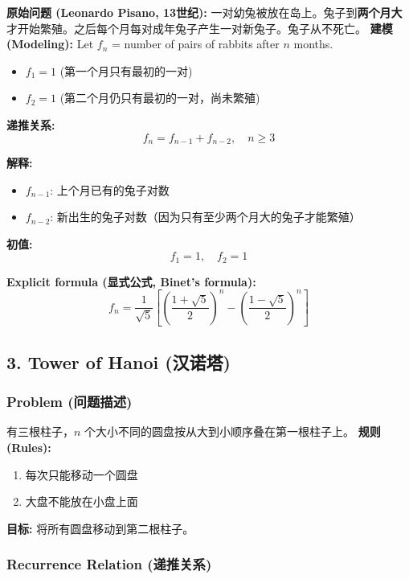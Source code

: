 \documentclass[10pt,a4paper,openany]{ctexbook}
\theoremstyle{definition}
\theoremstyle{remark}
\begin{document}
\textbf{原始问题 (Leonardo Pisano, 13世纪):}
一对幼兔被放在岛上。兔子到\textbf{两个月大}才开始繁殖。之后每个月每对成年兔子产生一对新兔子。兔子从不死亡。
\textbf{建模 (Modeling):}
Let $f_n$ = number of pairs of rabbits after $n$ months.
\begin{itemize}
\item $f_1 = 1$ (第一个月只有最初的一对)
\item $f_2 = 1$ (第二个月仍只有最初的一对，尚未繁殖)

\end{itemize}

\textbf{递推关系:}
\[
f_n = f_{n-1} + f_{n-2}, \quad n \ge 3
\]

\textbf{解释:}
\begin{itemize}
\item $f_{n-1}$: 上个月已有的兔子对数
\item $f_{n-2}$: 新出生的兔子对数（因为只有至少两个月大的兔子才能繁殖）

\end{itemize}

\textbf{初值:}
\[
f_1 = 1, \quad f_2 = 1
\]

\textbf{Explicit formula (显式公式, Binet's formula):}
\[
f_n = \frac{1}{\sqrt{5}}\left[\left(\frac{1+\sqrt{5}}{2}\right)^n - \left(\frac{1-\sqrt{5}}{2}\right)^n\right]
\]

\vspace{-2pt}

\subsection{3. Tower of Hanoi (汉诺塔)}

\subsubsection{Problem (问题描述)}

有三根柱子，$n$ 个大小不同的圆盘按从大到小顺序叠在第一根柱子上。
\textbf{规则 (Rules):}
\begin{enumerate}
\item 每次只能移动一个圆盘
\item 大盘不能放在小盘上面

\end{enumerate}

\textbf{目标:} 将所有圆盘移动到第二根柱子。
\subsubsection{Recurrence Relation (递推关系)}
\end{document}
